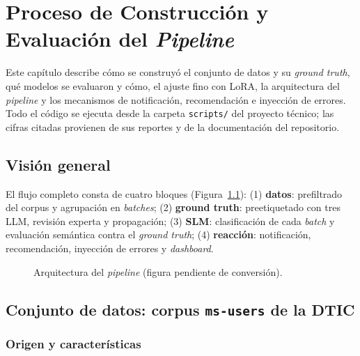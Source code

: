 \chapter{Proceso de Construcción y Evaluación del \textit{Pipeline}} \label{cap:metodologia}

Este capítulo describe cómo se construyó el conjunto de datos y su \textit{ground truth}, qué modelos se evaluaron y cómo, el ajuste fino con LoRA, la arquitectura del \textit{pipeline} y los mecanismos de notificación, recomendación e inyección de errores. Todo el código se ejecuta desde la carpeta \texttt{scripts/} del proyecto técnico; las cifras citadas provienen de sus reportes y de la documentación del repositorio.

\section{Visión general}\label{sec:met_vision}

El flujo completo consta de cuatro bloques (Figura~\ref{fig:arquitectura}): (1) \textbf{datos}: prefiltrado del corpus y agrupación en \textit{batches}; (2) \textbf{ground truth}: preetiquetado con tres LLM, revisión experta y propagación; (3) \textbf{SLM}: clasificación de cada \textit{batch} y evaluación semántica contra el \textit{ground truth}; (4) \textbf{reacción}: notificación, recomendación, inyección de errores y \textit{dashboard}.

\begin{figure}[H]
\centering
\caption{Arquitectura del \textit{pipeline} (figura pendiente de conversión).}
\label{fig:arquitectura}
\end{figure}

\section{Conjunto de datos: corpus \texttt{ms-users} de la DTIC}\label{sec:met_dataset}

\subsection{Origen y características}

